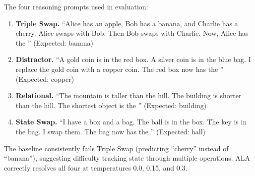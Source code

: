 \documentclass{article} %
\begin{document}
The four reasoning prompts used in evaluation:

\begin{enumerate}
    \item \textbf{Triple Swap.} ``Alice has an apple, Bob has a banana, and Charlie has a cherry. Alice swaps with Bob. Then Bob swaps with Charlie. Now, Alice has the \underline{\hspace{1cm}}'' (Expected: banana)
    \item \textbf{Distractor.} ``A gold coin is in the red box. A silver coin is in the blue bag. I replace the gold coin with a copper coin. The red box now has the \underline{\hspace{1cm}}'' (Expected: copper)
    \item \textbf{Relational.} ``The mountain is taller than the hill. The building is shorter than the hill. The shortest object is the \underline{\hspace{1cm}}'' (Expected: building)
    \item \textbf{State Swap.} ``I have a box and a bag. The ball is in the box. The key is in the bag. I swap them. The bag now has the \underline{\hspace{1cm}}'' (Expected: ball)
\end{enumerate}

The baseline consistently fails Triple Swap (predicting ``cherry'' instead of ``banana''), suggesting difficulty tracking state through multiple operations.
ALA correctly resolves all four at temperatures 0.0, 0.15, and 0.3.
\end{document}
